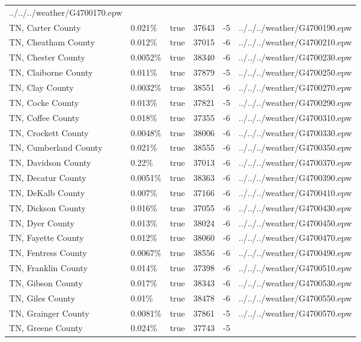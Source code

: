 \begin{longtable}[]{@{}llllll@{}}
../../../weather/G4700170.epw \\
TN, Carter County & 0.021\% & true & 37643 & -5 &
../../../weather/G4700190.epw \\
TN, Cheatham County & 0.012\% & true & 37015 & -6 &
../../../weather/G4700210.epw \\
TN, Chester County & 0.0052\% & true & 38340 & -6 &
../../../weather/G4700230.epw \\
TN, Claiborne County & 0.011\% & true & 37879 & -5 &
../../../weather/G4700250.epw \\
TN, Clay County & 0.0032\% & true & 38551 & -6 &
../../../weather/G4700270.epw \\
TN, Cocke County & 0.013\% & true & 37821 & -5 &
../../../weather/G4700290.epw \\
TN, Coffee County & 0.018\% & true & 37355 & -6 &
../../../weather/G4700310.epw \\
TN, Crockett County & 0.0048\% & true & 38006 & -6 &
../../../weather/G4700330.epw \\
TN, Cumberland County & 0.021\% & true & 38555 & -6 &
../../../weather/G4700350.epw \\
TN, Davidson County & 0.22\% & true & 37013 & -6 &
../../../weather/G4700370.epw \\
TN, Decatur County & 0.0051\% & true & 38363 & -6 &
../../../weather/G4700390.epw \\
TN, DeKalb County & 0.007\% & true & 37166 & -6 &
../../../weather/G4700410.epw \\
TN, Dickson County & 0.016\% & true & 37055 & -6 &
../../../weather/G4700430.epw \\
TN, Dyer County & 0.013\% & true & 38024 & -6 &
../../../weather/G4700450.epw \\
TN, Fayette County & 0.012\% & true & 38060 & -6 &
../../../weather/G4700470.epw \\
TN, Fentress County & 0.0067\% & true & 38556 & -6 &
../../../weather/G4700490.epw \\
TN, Franklin County & 0.014\% & true & 37398 & -6 &
../../../weather/G4700510.epw \\
TN, Gibson County & 0.017\% & true & 38343 & -6 &
../../../weather/G4700530.epw \\
TN, Giles County & 0.01\% & true & 38478 & -6 &
../../../weather/G4700550.epw \\
TN, Grainger County & 0.0081\% & true & 37861 & -5 &
../../../weather/G4700570.epw \\
TN, Greene County & 0.024\% & true & 37743 & -5 &

\end{longtable}
